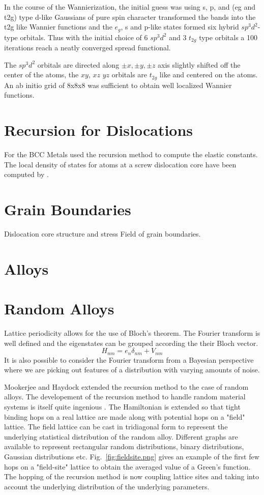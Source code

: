 In the course of the Wannierization, the initial guess was using s, p, and (eg and t2g)
type d-like Gaussians of pure spin character transformed the bands into the t2g like 
Wannier functions and the $e_{g}$, s and p-like states formed six hybrid 
$sp^{3}d^{2}$-type orbitals. Thus with the initial choice of 6 $sp^{3}d^{2}$ and 3 
$t_{2g}$  type orbitals a 100 iterations reach a neatly converged spread functional.

The $sp^{3}d^{2}$ orbitals are directed along $\pm x, \pm y, \pm z$ axis 
slightly shifted off the center of the atoms, the $xy$, $xz$ $yz$ orbitals are
$t_{2g}$ like and centered on the atoms. An ab initio grid of 8x8x8 was sufficient
to obtain well localized Wannier functions.

\section{Recursion for Dislocations}
For the BCC Metals \cite{terakura84} used the recursion method to compute the elastic constants.
The local density of states for atoms at a screw dislocation core have been computed by \cite{paidar81}. 

\section{Grain Boundaries}
Dislocation core structure and stress Field of grain boundaries.

\section{Alloys}
\section{Random Alloys}
Lattice periodicity allows for the use of Bloch's theorem. The Fourier transform
is well defined and the eigenstates can be grouped according the their Bloch vector.
%
\begin{equation}
H_{nm} = e_{n}\delta_{nm} + V_{nm}
\end{equation}
%
It is also possible to consider the Fourier transform from a Bayesian perspective
where we are picking out features of a distribution with varying amounts of noise.

Mookerjee and Haydock extended the recursion method to the case of random alloys.
The developement of the recursion method to handle random material systems is 
itself quite ingenious \cite{mookerjee , haydock74}. The Hamiltonian is extended
so that tight binding hops on a real lattice are made along with potential hops
on a "field" lattice. The field lattice can be cast in tridiagonal form to represent
the underlying statistical distribution of the random alloy. Different graphs are available
to represent rectangular random distributions, binary distributions, Gaussian distributions
etc. Fig.~\ref{fig:fieldsite.png} gives an example of the first few hops on a "field-site" 
lattice to obtain the averaged value of a Green's function. The hopping of the recursion method
is now coupling lattice sites and taking into account the underlying distribution of 
the underlying parameters.

